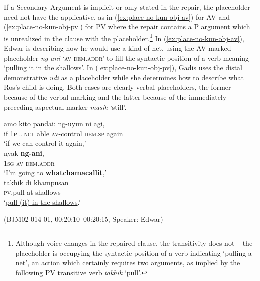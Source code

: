 \documentclass[output=paper,colorlinks,citecolor=brown
\ChapterDOI{10.5281/zenodo.15697585}
]{langscibook}
\begin{document}
 If a Secondary Argument is implicit or only stated in the repair, the placeholder need not have the applicative, as in (\ref{ex:place-no-kun-obj-av}) for AV and (\ref{ex:place-no-kun-obj-pv}) for PV where the repair contains a P argument which is unrealized in the clause with the placeholder.\footnote{Although voice changes in the repaired clause, the transitivity does not -- the placeholder is occupying the syntactic position of a verb indicating `pulling a net', an action which certainly requires two arguments, as implied by the following PV transitive verb \textit{takhik} `pull'.} In (\ref{ex:place-no-kun-obj-av}), Edwar is describing how he would use a kind of net, using the AV-marked placeholder \textit{ng-ani} `\textsc{av-dem.addr}' to fill the syntactic position of a verb meaning `pulling it in the shallows'. In (\ref{ex:place-no-kun-obj-pv}), Gadis uses the distal demonstrative \textit{udi} as a placeholder while she determines how to describe what Ros's child is doing. Both cases are clearly verbal placeholders, the former because of the verbal marking and the latter because of the immediately preceding aspectual marker \textit{masih} `still'.

\begin{exe}
    \ex\label{ex:place-no-kun-obj-av} \begin{xlist}[0\quad →A:]
         \gll
        amo kito pandai: ng-uyun ni agi, \\
        if 1\textsc{pl.incl} able \textsc{av}-control \textsc{dem.sp} again \\
        \glt `if we can control it again,' \\
         \gll
        nyak \textbf{ng-ani}, \\
        1\textsc{sg} \textsc{av}-\textsc{dem.addr} \\
        \glt `I'm going to \textbf{whatchamacallit},' \\
        \exi{3\quad \hphantom{→E:}} \gll
        \uline{takhik di khampusan} \\
        {\textsc{pv}.{pull} at shallows} \\
        \glt `\uline{pull (it) in the shallows}.' \\
    \end{xlist}
    \hfill (BJM02-014-01, 00:20:10–00:20:15, Speaker: Edwar) 
\end{exe}
\end{document}
